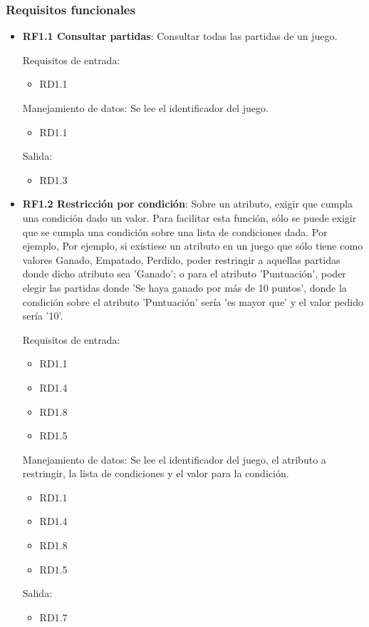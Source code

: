 \subsubsection{Requisitos funcionales}
\begin{itemize}
	\item \textbf{RF1.1 Consultar partidas}: Consultar todas las partidas de un juego.
	
	Requisitos de entrada:
	\begin{itemize}
		\item RD1.1
	\end{itemize}
	Manejamiento de datos: Se lee el identificador del juego.
	\begin{itemize}
		\item RD1.1
	\end{itemize}
	Salida:
	\begin{itemize}
		\item RD1.3
	\end{itemize}
	
	
	\item \textbf{RF1.2 Restricción por condición}: Sobre un atributo, exigir que cumpla una condición dado un valor. Para facilitar esta función, sólo se puede exigir que se cumpla una condición sobre una lista de condiciones dada. Por ejemplo, Por ejemplo, si existiese un atributo en un juego que sólo tiene como valores {Ganado, Empatado, Perdido}, poder restringir a aquellas partidas donde dicho atributo sea 'Ganado'; o para el atributo 'Puntuación', poder elegir las partidas donde 'Se haya ganado por más de 10 puntos', donde la condición sobre el atributo 'Puntuación' sería 'es mayor que' y el valor pedido sería '10'.
	
	Requisitos de entrada:
	\begin{itemize}
		\item RD1.1
		\item RD1.4
		\item RD1.8
		\item RD1.5
	\end{itemize}
	Manejamiento de datos: Se lee el identificador del juego, el atributo a restringir, la lista de condiciones y el valor para la condición.
	\begin{itemize}
		\item RD1.1
		\item RD1.4
		\item RD1.8
		\item RD1.5
	\end{itemize}
	Salida:
	\begin{itemize}
		\item RD1.7
	\end{itemize}
	

\end{itemize}
